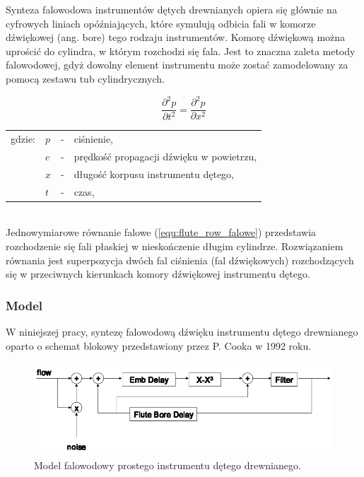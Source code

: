 Synteza falowodowa instrumentów dętych drewnianych opiera się głównie na cyfrowych liniach opóźniających, które symulują odbicia fali w komorze dźwiękowej (ang. bore) tego rodzaju instrumentów. Komorę dźwiękową można uprościć do cylindra, w którym rozchodzi się fala. Jest to znaczna zaleta metody falowodowej, gdyż dowolny element instrumentu może zostać zamodelowany za pomocą zestawu tub cylindrycznych.

\begin{equation} \label{equ:flute_row_falowe}
\frac{\partial^2 p}{\partial t^2} = \frac{\partial^2 p}{\partial x^2}
\end{equation}
\begin{tabular}{ l l l l}
	gdzie: 	&	$p$ & - &  ciśnienie, \\
	& $c$ &  - & prędkość propagacji dźwięku w powietrzu, \\
	&	$x$ & - &  długość korpusu instrumentu dętego,\\
	&	$t$ & - &  czas, \\
\end{tabular} \\

Jednowymiarowe równanie falowe (\ref{equ:flute_row_falowe}) przedstawia rozchodzenie się fali płaskiej w nieskończenie długim cylindrze. Rozwiązaniem równania jest superpozycja dwóch fal ciśnienia (fal dźwiękowych) rozchodzących się w przeciwnych kierunkach komory dźwiękowej instrumentu dętego.


\subsubsection{Model}
W niniejszej pracy, syntezę falowodową dźwięku instrumentu dętego drewnianego oparto o schemat blokowy przedstawiony przez P. Cooka w 1992 roku.

\begin{figure}[H]
	\centering
	\includegraphics[width=14cm]{grafiki/flute_waveguide_mod}
	\captionsetup{justification=centering}
	\caption{Model falowodowy prostego instrumentu dętego drewnianego.}
	\label{rys:flute_cook}
\end{figure}

